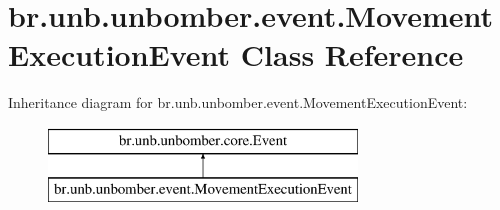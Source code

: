 \hypertarget{classbr_1_1unb_1_1unbomber_1_1event_1_1_movement_execution_event}{\section{br.\+unb.\+unbomber.\+event.\+Movement\+Execution\+Event Class Reference}
\label{classbr_1_1unb_1_1unbomber_1_1event_1_1_movement_execution_event}
}
Inheritance diagram for br.\+unb.\+unbomber.\+event.\+Movement\+Execution\+Event\+:\begin{figure}[H]
\begin{center}
\leavevmode
\includegraphics[height=2.000000cm]{classbr_1_1unb_1_1unbomber_1_1event_1_1_movement_execution_event}
\end{center}
\end{figure}
